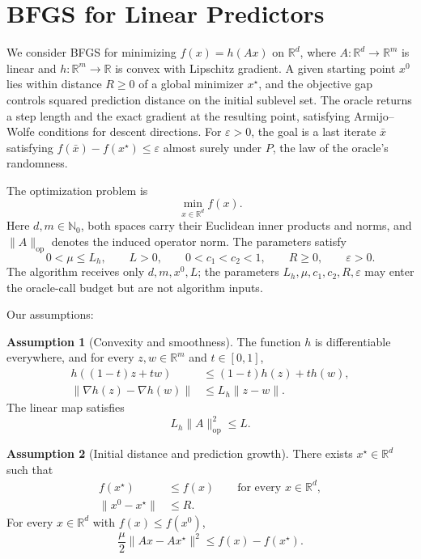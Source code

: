 \documentclass[10pt]{article}
\theoremstyle{definition}
\newtheorem{assumption}{Assumption}
\begin{document}
\section*{BFGS for Linear Predictors}
We consider BFGS for minimizing $f(x)=h(Ax)$ on $\mathbb{R}^d$, where $A:\mathbb{R}^d\to\mathbb{R}^m$ is linear and $h:\mathbb{R}^m\to\mathbb{R}$ is convex with Lipschitz gradient. A given starting point $x^0$ lies within distance $R\geq0$ of a global minimizer $x^\star$, and the objective gap controls squared prediction distance on the initial sublevel set. The oracle returns a step length and the exact gradient at the resulting point, satisfying Armijo--Wolfe conditions for descent directions. For $\varepsilon>0$, the goal is a last iterate $\bar{x}$ satisfying $f(\bar{x})-f(x^\star)\leq\varepsilon$ almost surely under $P$, the law of the oracle's randomness.

The optimization problem is
\[
\min_{x\in\mathbb{R}^d} f(x).
\]
Here $d,m\in\mathbb{N}_0$, both spaces carry their Euclidean inner products and norms, and $\|A\|_{\mathrm{op}}$ denotes the induced operator norm. The parameters satisfy
\[
0<\mu\leq L_h,\qquad L>0,\qquad
0<c_1<c_2<1,\qquad R\geq0,\qquad\varepsilon>0.
\]
The algorithm receives only $d,m,x^0,L$; the parameters $L_h,\mu,c_1,c_2,R,\varepsilon$ may enter the oracle-call budget but are not algorithm inputs.

Our assumptions:
\begin{assumption}[Convexity and smoothness]
The function $h$ is differentiable everywhere, and for every $z,w\in\mathbb{R}^m$ and $t\in[0,1]$,
\[
\begin{aligned}
h((1-t)z+tw)&\leq(1-t)h(z)+t h(w),\\
\|\nabla h(z)-\nabla h(w)\|&\leq L_h\|z-w\|.
\end{aligned}
\]
The linear map satisfies
\[
L_h\|A\|_{\mathrm{op}}^2\leq L.
\]
\end{assumption}

\begin{assumption}[Initial distance and prediction growth]
There exists $x^\star\in\mathbb{R}^d$ such that
\[
\begin{aligned}
f(x^\star)&\leq f(x)\qquad\text{for every }x\in\mathbb{R}^d,\\
\|x^0-x^\star\|&\leq R.
\end{aligned}
\]
For every $x\in\mathbb{R}^d$ with $f(x)\leq f(x^0)$,
\[
\frac{\mu}{2}\|Ax-Ax^\star\|^2
\leq f(x)-f(x^\star).
\]
\end{assumption}
\end{document}
